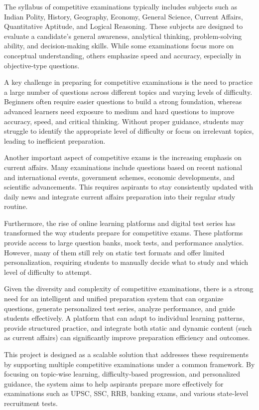 \begin{sloppypar}
The syllabus of competitive examinations typically includes subjects such as Indian Polity, History, Geography, Economy, General Science, Current Affairs, Quantitative Aptitude, and Logical Reasoning. These subjects are designed to evaluate a candidate's general awareness, analytical thinking, problem-solving ability, and decision-making skills. While some examinations focus more on conceptual understanding, others emphasize speed and accuracy, especially in objective-type questions.

A key challenge in preparing for competitive examinations is the need to practice a large number of questions across different topics and varying levels of difficulty. Beginners often require easier questions to build a strong foundation, whereas advanced learners need exposure to medium and hard questions to improve accuracy, speed, and critical thinking. Without proper guidance, students may struggle to identify the appropriate level of difficulty or focus on irrelevant topics, leading to inefficient preparation.

Another important aspect of competitive exams is the increasing emphasis on current affairs. Many examinations include questions based on recent national and international events, government schemes, economic developments, and scientific advancements. This requires aspirants to stay consistently updated with daily news and integrate current affairs preparation into their regular study routine.

Furthermore, the rise of online learning platforms and digital test series has transformed the way students prepare for competitive exams. These platforms provide access to large question banks, mock tests, and performance analytics. However, many of them still rely on static test formats and offer limited personalization, requiring students to manually decide what to study and which level of difficulty to attempt.

Given the diversity and complexity of competitive examinations, there is a strong need for an intelligent and unified preparation system that can organize questions, generate personalized test series, analyze performance, and guide students effectively. A platform that can adapt to individual learning patterns, provide structured practice, and integrate both static and dynamic content (such as current affairs) can significantly improve preparation efficiency and outcomes.

This project is designed as a scalable solution that addresses these requirements by supporting multiple competitive examinations under a common framework. By focusing on topic-wise learning, difficulty-based progression, and personalized guidance, the system aims to help aspirants prepare more effectively for examinations such as UPSC, SSC, RRB, banking exams, and various state-level recruitment tests.


\end{sloppypar}
